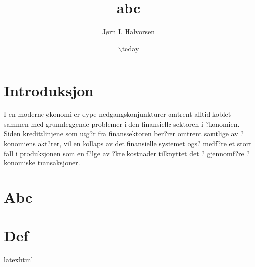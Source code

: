 \documentclass{article}
\author{Jørn I. Halvorsen}
\date{$\backslash$today}
\title{abc}
\begin{document}
\maketitle
\tableofcontents


\section{Introduksjon}
\label{sec-1}
I en moderne økonomi er dype nedgangskonjunkturer omtrent alltid koblet sammen med grunnleggende problemer i den finansielle sektoren i ?konomien.  Siden kredittlinjene som utg?r fra finanssektoren ber?rer omtrent samtlige av ?konomiens akt?rer, vil en kollaps av det finansielle systemet ogs? medf?re et stort fall i produksjonen som en f?lge av ?kte kostnader tilknyttet det ? gjennomf?re ?konomiske transaksjoner.

\section{Abc}
\label{sec-2}

\section{Def}
\label{sec-3}





\href{http://orgmode.org/worg/org-tutorials/org-latex-export.html}{latexhtml}
\end{document}
